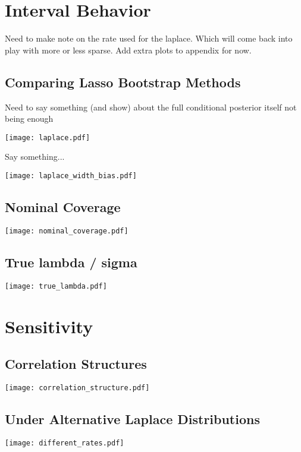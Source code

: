 \section{Interval Behavior}

Need to make note on the rate used for the laplace. Which will come back into play with more or less sparse. Add extra plots to appendix for now.

\subsection{Comparing Lasso Bootstrap Methods}

Need to say something (and show) about the full conditional posterior itself not being enough

\texttt{[image: laplace.pdf]}

Say something...

\texttt{[image: laplace\_width\_bias.pdf]}

\subsection{Nominal Coverage}

\texttt{[image: nominal\_coverage.pdf]}

\subsection{True lambda / sigma}

\texttt{[image: true\_lambda.pdf]}

\section{Sensitivity}

\subsection{Correlation Structures}

\texttt{[image: correlation\_structure.pdf]}

\subsection{Under Alternative Laplace Distributions}

\texttt{[image: different\_rates.pdf]}

